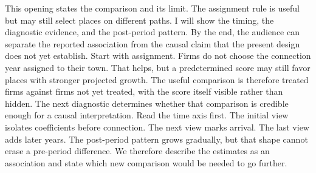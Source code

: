 \documentclass{article}
\newcommand{\scriptopening}[2]{#2}
\newcommand{\scriptframe}[3]{#3}
\newcommand{\Click}[1]{}
\begin{document}
\scriptopening{0.4 min}{%
  This opening states the comparison and its limit. The assignment rule is
  useful but may still select places on different paths. I will show the
  timing, the diagnostic evidence, and the post-period pattern. By the end,
  the audience can separate the reported association from the causal claim
  that the present design does not yet establish.}
\scriptframe{Rollout timing identifies the effect}{0.5 min}{%
  Start with assignment. Firms do not choose the connection year assigned to
  their town. That helps, but a predetermined score may still favor places
  with stronger projected growth. The useful comparison is therefore treated
  firms against firms not yet treated, with the score itself visible rather
  than hidden. The next diagnostic determines whether that comparison is
  credible enough for a causal interpretation.}
\scriptframe{Effects build over three years}{0.6 min}{%
  Read the time axis first. The initial view isolates coefficients before
  connection. \Click{2} The next view marks arrival. \Click{3} The last view
  adds later years. The post-period pattern grows gradually, but that shape
  cannot erase a pre-period difference. We therefore describe the estimates
  as an association and state which new comparison would be needed to go
  further.}
\end{document}
